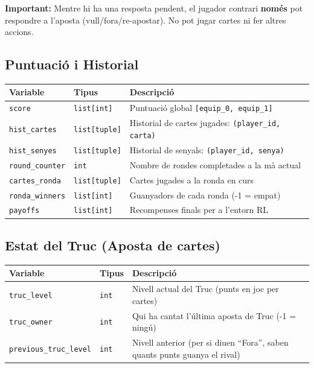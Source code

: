 \documentclass[a4paper,11pt]{report}
\begin{document}
\noindent\textbf{Important:}
Mentre hi ha una resposta pendent, el jugador contrari \textbf{només} pot respondre a l'aposta (vull/fora/re-apostar). No pot jugar cartes ni fer altres accions.

\hrulefill

\subsection{Puntuació i Historial}

\begin{longtable}{|l|l|p{6cm}|}
\hline
\textbf{Variable} & \textbf{Tipus} & \textbf{Descripció} \\
\hline
\texttt{score} & \texttt{list[int]} & Puntuació global \texttt{[equip\_0, equip\_1]} \\
\texttt{hist\_cartes} & \texttt{list[tuple]} & Historial de cartes jugades: \texttt{(player\_id, carta)} \\
\texttt{hist\_senyes} & \texttt{list[tuple]} & Historial de senyals: \texttt{(player\_id, senya)} \\
\texttt{round\_counter} & \texttt{int} & Nombre de rondes completades a la mà actual \\
\texttt{cartes\_ronda} & \texttt{list[tuple]} & Cartes jugades a la ronda en curs \\
\texttt{ronda\_winners} & \texttt{list[int]} & Guanyadors de cada ronda (-1 = empat) \\
\texttt{payoffs} & \texttt{list[int]} & Recompenses finals per a l'entorn RL \\
\hline
\end{longtable}

\subsection{Estat del Truc (Aposta de cartes)}

\begin{longtable}{|l|l|p{6cm}|}
\hline
\textbf{Variable} & \textbf{Tipus} & \textbf{Descripció} \\
\hline
\texttt{truc\_level} & \texttt{int} & Nivell actual del Truc (punts en joc per cartes) \\
\texttt{truc\_owner} & \texttt{int} & Qui ha cantat l'última aposta de Truc (-1 = ningú) \\
\texttt{previous\_truc\_level} & \texttt{int} & Nivell anterior (per si diuen ``Fora'', saben quants punts guanya el rival) \\
\hline
\end{longtable}
\end{document}
